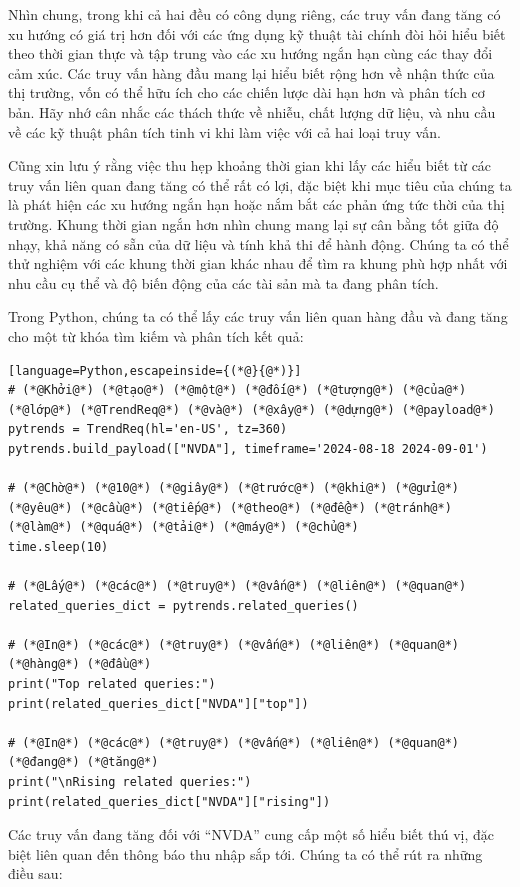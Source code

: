 Nhìn chung, trong khi cả hai đều có công dụng riêng, các truy vấn đang tăng có xu hướng có giá trị hơn đối với các ứng dụng kỹ thuật tài chính đòi hỏi hiểu biết theo thời gian thực và tập trung vào các xu hướng ngắn hạn cùng các thay đổi cảm xúc. Các truy vấn hàng đầu mang lại hiểu biết rộng hơn về nhận thức của thị trường, vốn có thể hữu ích cho các chiến lược dài hạn hơn và phân tích cơ bản. Hãy nhớ cân nhắc các thách thức về nhiễu, chất lượng dữ liệu, và nhu cầu về các kỹ thuật phân tích tinh vi khi làm việc với cả hai loại truy vấn.

Cũng xin lưu ý rằng việc thu hẹp khoảng thời gian khi lấy các hiểu biết từ các truy vấn liên quan đang tăng có thể rất có lợi, đặc biệt khi mục tiêu của chúng ta là phát hiện các xu hướng ngắn hạn hoặc nắm bắt các phản ứng tức thời của thị trường. Khung thời gian ngắn hơn nhìn chung mang lại sự cân bằng tốt giữa độ nhạy, khả năng có sẵn của dữ liệu và tính khả thi để hành động. Chúng ta có thể thử nghiệm với các khung thời gian khác nhau để tìm ra khung phù hợp nhất với nhu cầu cụ thể và độ biến động của các tài sản mà ta đang phân tích.

Trong Python, chúng ta có thể lấy các truy vấn liên quan hàng đầu và đang tăng cho một từ khóa tìm kiếm và phân tích kết quả:

\begin{lstlisting}[language=Python,escapeinside={(*@}{@*)}]
# (*@Khởi@*) (*@tạo@*) (*@một@*) (*@đối@*) (*@tượng@*) (*@của@*) (*@lớp@*) (*@TrendReq@*) (*@và@*) (*@xây@*) (*@dựng@*) (*@payload@*)
pytrends = TrendReq(hl='en-US', tz=360)
pytrends.build_payload(["NVDA"], timeframe='2024-08-18 2024-09-01')

# (*@Chờ@*) (*@10@*) (*@giây@*) (*@trước@*) (*@khi@*) (*@gửi@*) (*@yêu@*) (*@cầu@*) (*@tiếp@*) (*@theo@*) (*@để@*) (*@tránh@*) (*@làm@*) (*@quá@*) (*@tải@*) (*@máy@*) (*@chủ@*)
time.sleep(10)

# (*@Lấy@*) (*@các@*) (*@truy@*) (*@vấn@*) (*@liên@*) (*@quan@*)
related_queries_dict = pytrends.related_queries()

# (*@In@*) (*@các@*) (*@truy@*) (*@vấn@*) (*@liên@*) (*@quan@*) (*@hàng@*) (*@đầu@*)
print("Top related queries:")
print(related_queries_dict["NVDA"]["top"])

# (*@In@*) (*@các@*) (*@truy@*) (*@vấn@*) (*@liên@*) (*@quan@*) (*@đang@*) (*@tăng@*)
print("\nRising related queries:")
print(related_queries_dict["NVDA"]["rising"])
\end{lstlisting}

Các truy vấn đang tăng đối với ``NVDA'' cung cấp một số hiểu biết thú vị, đặc biệt liên quan đến thông báo thu nhập sắp tới. Chúng ta có thể rút ra những điều sau:

